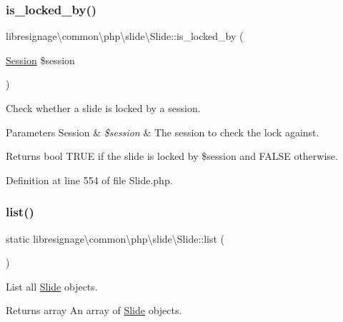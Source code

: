 \subsubsection{\texorpdfstring{is\+\_\+locked\+\_\+by()}{is\_locked\_by()}}
{\footnotesize\ttfamily libresignage\textbackslash{}common\textbackslash{}php\textbackslash{}slide\textbackslash{}\+Slide\+::is\+\_\+locked\+\_\+by (\begin{DoxyParamCaption}\item[{\hyperlink{classlibresignage_1_1common_1_1php_1_1auth_1_1Session}{Session}}]{\$session }\end{DoxyParamCaption})}

Check whether a slide is locked by a session.


\begin{DoxyParams}[1]{Parameters}
Session & {\em \$session} & The session to check the lock against.\\
\hline
\end{DoxyParams}
\begin{DoxyReturn}{Returns}
bool T\+R\+UE if the slide is locked by \$session and F\+A\+L\+SE otherwise. 
\end{DoxyReturn}


Definition at line 554 of file Slide.\+php.

\mbox{\label{classlibresignage_1_1common_1_1php_1_1slide_1_1Slide_aac4106d3da3ec25c0bf52e5b050cf336}} 
\subsubsection{\texorpdfstring{list()}{list()}}
{\footnotesize\ttfamily static libresignage\textbackslash{}common\textbackslash{}php\textbackslash{}slide\textbackslash{}\+Slide\+::list (\begin{DoxyParamCaption}{ }\end{DoxyParamCaption})\hspace{0.3cm}{\ttfamily [static]}}

List all \hyperlink{classlibresignage_1_1common_1_1php_1_1slide_1_1Slide}{Slide} objects.

\begin{DoxyReturn}{Returns}
array An array of \hyperlink{classlibresignage_1_1common_1_1php_1_1slide_1_1Slide}{Slide} objects. 
\end{DoxyReturn}


